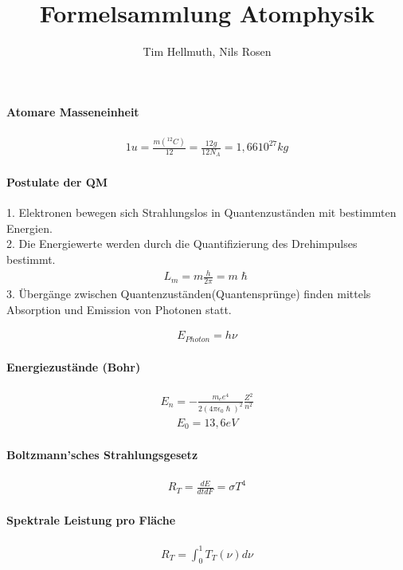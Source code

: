 \documentclass[10pt,a4paper]{article}
\author{Tim Hellmuth, Nils Rosen}
\title{Formelsammlung Atomphysik}
\begin{document}
\maketitle
{}
\paragraph{Atomare Masseneinheit}
\begin{align}
1u=\frac{m(^{12}C)}{12}=\frac{12g}{12N_A}=1,66 10^{27}kg
\end{align}
\paragraph{Postulate der QM}$\,$ \\
1. Elektronen bewegen sich Strahlungslos in Quantenzuständen mit bestimmten Energien.\\
2. Die Energiewerte werden durch die Quantifizierung des Drehimpulses bestimmt.\\
\begin{align}
L_m=m\frac{h}{2\pi}=m \hslash
\end{align}
3. Übergänge zwischen Quantenzuständen(Quantensprünge) finden mittels Absorption und Emission von Photonen statt.

\begin{align}
E_{Photon} = h   \nu
\end{align}
\paragraph{Energiezustände (Bohr)}$\,$ \\
\begin{align}
E_n = -\frac{m_e e^4}{2 (4\pi \epsilon_0 \hslash)^2} \frac{Z^2}{n^2}
\end{align}
\begin{align}
E_0=13,6 eV
\end{align}
\paragraph{Boltzmann'sches Strahlungsgesetz}$\,$ \\
\begin{align}
R_T= \frac{dE}{dtdF}=\sigma T^4
\end{align}
\paragraph{Spektrale Leistung pro Fläche}$\,$ \\
\begin{align}
R_T = \int_0^1 T_T(\nu) d\nu
\end{align}
\end{document}
